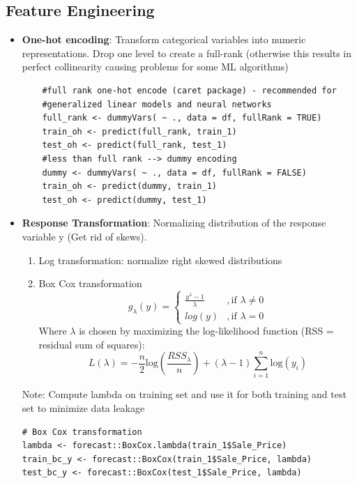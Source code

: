 \documentclass[12pt, oneside]{article}
\begin{document}
\subsection{Feature Engineering}
\begin{itemize}
    \item \textbf{One-hot encoding}: Transform categorical variables into numeric representations. Drop one level to create a full-rank (otherwise this results in perfect collinearity causing problems for some ML algorithms)
    
    \begin{verbatim}
    #full rank one-hot encode (caret package) - recommended for 
    #generalized linear models and neural networks
    full_rank <- dummyVars( ~ ., data = df, fullRank = TRUE)
    train_oh <- predict(full_rank, train_1)
    test_oh <- predict(full_rank, test_1)
    #less than full rank --> dummy encoding
    dummy <- dummyVars( ~ ., data = df, fullRank = FALSE)
    train_oh <- predict(dummy, train_1)
    test_oh <- predict(dummy, test_1)
    \end{verbatim}
    
    \item \textbf{Response Transformation}: Normalizing distribution of the response variable y (Get rid of skews).
    \begin{enumerate}
        \item Log transformation: normalize right skewed distributions
        \item Box Cox transformation $$g_\lambda(y) = \begin{cases}
            \frac{y^\lambda - 1}{\lambda} & ,\text{if } \lambda  \neq 0  \\ 
            log(y) &  ,\text{if } \lambda = 0 
        \end{cases}$$
        Where $\lambda$ is chosen by maximizing the log-likelihood function (RSS = residual sum of squares): $$L(\lambda) = -\frac{n}{2}\text{log}(\frac{RSS_\lambda}{n}) + (\lambda -1)\sum_{i=1}^{n}\text{log}(y_i)$$
    \end{enumerate}

    Note: Compute lambda on training set and use it for both training and test set to minimize data leakage
    
    \begin{lstlisting}
# Box Cox transformation
lambda <- forecast::BoxCox.lambda(train_1$Sale_Price)
train_bc_y <- forecast::BoxCox(train_1$Sale_Price, lambda)
test_bc_y <- forecast::BoxCox(test_1$Sale_Price, lambda)
    \end{lstlisting}
    

\end{itemize}
\end{document}
